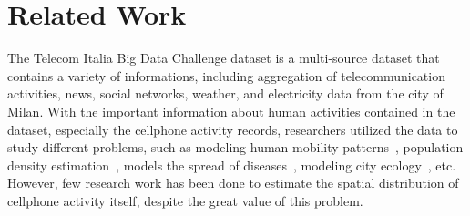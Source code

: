 \section{Related Work}
\label{sec:related}













The Telecom Italia Big Data Challenge dataset is a multi-source dataset that contains a variety of informations, including aggregation of telecommunication activities, news, social networks, weather, and electricity data from the city of Milan. With the important information about human activities contained in the dataset, especially the cellphone activity records, researchers utilized the data to study different problems, such as modeling human mobility patterns~\cite{gonzalez2008understanding}, population density estimation~\cite{douglass2015high}, models the spread of diseases~\cite{blondel2015survey}, modeling city ecology~\cite{bcici_mobihoc15}, etc. However, few research work has been done to estimate the spatial distribution of cellphone activity itself, despite the great value of this problem.

